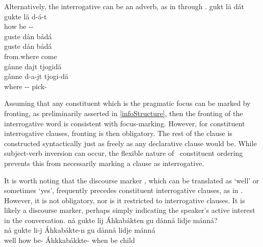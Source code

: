 Alternatively, the interrogative can be an adverb, as in  through . %
\ea\label{questionWordQ6}%
\glll	gukt lä dát\\
	gukte lä d-á-t\\
	how be\BS{} --\\\nopagebreak
{} 
\z
\ea\label{questionWordQ7}%
\glll	guste dån bådá\\
	guste dån bådá\\
	from.where  come\BS{}\\\nopagebreak
{} 
\z
\ea\label{questionWordQ8}%
\glll	gånne dajt tjogidä\\
	gånne d-a-jt tjogi-dä\\
	where -- pick-\\\nopagebreak
{} 
\z

Assuming that any constituent which is the pragmatic focus can be marked by fronting, as preliminarily asserted in \SEC\ref{infoStructure}, then the fronting of the interrogative word is consistent with focus-marking. However, for constituent interrogative clauses, fronting is then obligatory. 
The rest of the clause is constructed syntactically just as freely as any declarative clause would be. While subject-verb inversion can occur, the flexible nature of \PS\ constituent ordering prevents this from necessarily marking a clause as interrogative. 

It is worth noting that the discourse marker , which can be translated as ‘well’ or sometimes ‘yes’, frequently precedes constituent interrogative clauses, as in . However, it is not obligatory, nor is it restricted to interrogative clauses. It is likely a discourse marker, perhaps simply indicating the speaker’s active interest in the conversation.
\ea\label{nåQ1}%
\glll	nå gukte lij Áhkabákten gu dånnå lidje mánná?\\
	nå gukte li-j Áhkabákte-n gu dånnå lidje mánná\\
	well how be- Áhkkabákkte- when  be\BS{} child\BS{}\\\nopagebreak
{} 
\z
{}

